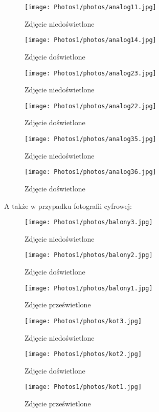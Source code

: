 \documentclass[]{mwart}
\begin{document}
\begin{figure}[H]
    \centering
    \texttt{[image: Photos1/photos/analog11.jpg]}
    \caption{Zdjęcie niedoświetlone}
\end{figure}
\begin{figure}[H]
    \centering
    \texttt{[image: Photos1/photos/analog14.jpg]}
    \caption{Zdjęcie doświetlone}
\end{figure}



\begin{figure}[H]
    \centering
    \texttt{[image: Photos1/photos/analog23.jpg]}
    \caption{Zdjęcie niedoświetlone}
\end{figure}
\begin{figure}[H]
    \centering
    \texttt{[image: Photos1/photos/analog22.jpg]}
    \caption{Zdjęcie doświetlone}
\end{figure}


\begin{figure}[H]
    \centering
    \texttt{[image: Photos1/photos/analog35.jpg]}
    \caption{Zdjęcie niedoświetlone}
\end{figure}
\begin{figure}[H]
    \centering
    \texttt{[image: Photos1/photos/analog36.jpg]}
    \caption{Zdjęcie doświetlone}
\end{figure}


\newpage
A także w przypadku fotografii cyfrowej:

\begin{figure}[H]
    \centering
    \texttt{[image: Photos1/photos/balony3.jpg]}
    \caption{Zdjęcie niedoświetlone}
\end{figure}
\begin{figure}[H]
    \centering
    \texttt{[image: Photos1/photos/balony2.jpg]}
    \caption{Zdjęcie doświetlone}
\end{figure}
\begin{figure}[H]
    \centering
    \texttt{[image: Photos1/photos/balony1.jpg]}
    \caption{Zdjęcie prześwietlone}
\end{figure}


\begin{figure}[H]
    \centering
    \texttt{[image: Photos1/photos/kot3.jpg]}
    \caption{Zdjęcie niedoświetlone}
\end{figure}
\begin{figure}[H]
    \centering
    \texttt{[image: Photos1/photos/kot2.jpg]}
    \caption{Zdjęcie doświetlone}
\end{figure}
\begin{figure}[H]
    \centering
    \texttt{[image: Photos1/photos/kot1.jpg]}
    \caption{Zdjęcie prześwietlone}
\end{figure}
\end{document}
